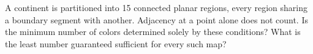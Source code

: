 A continent is partitioned into 15 connected planar regions, every region sharing a boundary segment with another. Adjacency at a point alone does not count. Is the minimum number of colors determined solely by these conditions? What is the least number guaranteed sufficient for every such map?
